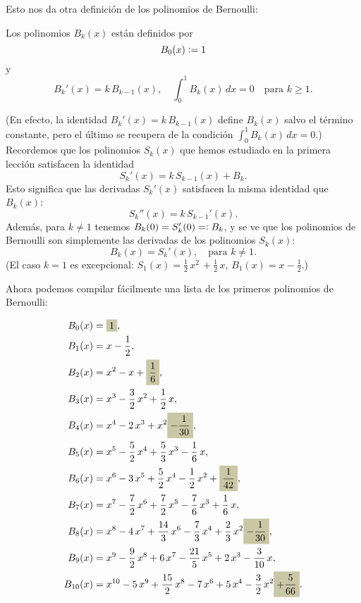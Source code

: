 \documentclass{article}
\newcommand{\highlight}[1]{\colorbox{shadecolor}{$\displaystyle #1$}}
\begin{document}
Esto nos da otra definición de los polinomios de Bernoulli:

\begin{definicion-alternativa*}
Los polinomios $B_k (x)$ están definidos por
$$B_0 (x) \mathrel{\mathop:}= 1$$
y
$$B_k' (x) = k\,B_{k-1} (x), \quad \int_0^1 B_k (x) \, dx = 0 \quad \text{para }k \ge 1.$$
\end{definicion-alternativa*}

\noindent (En efecto, la identidad $B_k' (x) = k\,B_{k-1} (x)$ define $B_k (x)$ salvo el término constante, pero el último se recupera de la condición $\int_0^1 B_k (x) \, dx = 0$.) Recordemos que los polinomios $S_k (x)$ que hemos estudiado en la primera lección satisfacen la identidad
$$S_k' (x) = k\,S_{k-1} (x) + B_k.$$
Esto significa que las derivadas $S_k' (x)$ satisfacen la misma identidad que $B_k (x)$:
$$S_k'' (x) = k\,S_{k-1}' (x).$$
Además, para $k\ne 1$ tenemos $B_k (0) = S_k' (0) =\mathrel{\mathop:} B_k$, y se ve que los polinomios de Bernoulli son simplemente las derivadas de los polinomios $S_k (x)$:
$$B_k (x) = S_k' (x), \quad \text{para }k\ne 1.$$
(El caso $k = 1$ es excepcional: $S_1 (x) = \frac{1}{2}\,x^2\,+\frac{1}{2}\,x$, $B_1 (x) = x - \frac{1}{2}$.)

\pagebreak

Ahora podemos compilar fácilmente una lista de los primeros polinomios de Bernoulli:

\begin{align*}
B_0 (x) & = \highlight{1}, \\
B_1 (x) & = x - \frac{1}{2}, \\
B_2 (x) & = x^2 - x + \highlight{\frac{1}{6}}, \\
B_3 (x) & = x^3 - \frac{3}{2}\,x^2 + \frac{1}{2}\,x,\\
B_4 (x) & = x^4 - 2\,x^3 + x^2 \highlight{- \frac{1}{30}}, \\
B_5 (x) & = x^5 - \frac{5}{2}\,x^4 + \frac{5}{3}\,x^3 - \frac{1}{6}\,x, \\
B_6 (x) & = x^6 - 3\,x^5 + \frac{5}{2}\,x^4 - \frac{1}{2}\,x^2 + \highlight{\frac{1}{42}},\\
B_7 (x) & = x^7 - \frac{7}{2}\,x^6 + \frac{7}{2}\,x^5 - \frac{7}{6}\,x^3 + \frac{1}{6}\,x, \\
B_8 (x) & = x^8 - 4\,x^7 + \frac{14}{3}\,x^6 - \frac{7}{3}\,x^4 + \frac{2}{3}\,x^2 \highlight{- \frac{1}{30}},\\
B_9 (x) & = x^9 - \frac{9}{2}\,x^8 + 6\,x^7 - \frac{21}{5}\,x^5 + 2\,x^3 - \frac{3}{10}\,x, \\
B_{10} (x) & = x^{10} - 5\,x^9 + \frac{15}{2}\,x^8 - 7\,x^6 + 5\,x^4 - \frac{3}{2}\,x^2 \highlight{+ \frac{5}{66}}.
\end{align*}
\end{document}
